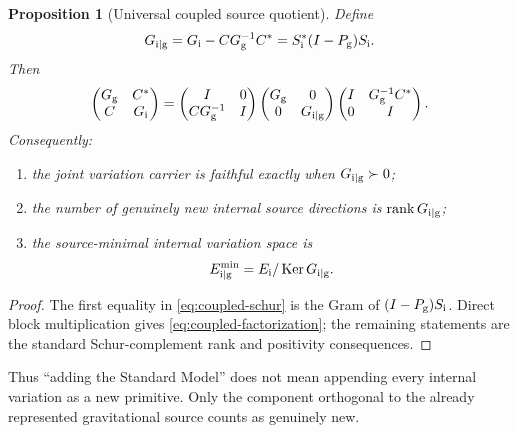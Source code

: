 \documentclass[11pt]{article}
\numberwithin{equation}{section}
\newtheorem{proposition}[theorem]{Proposition}
\theoremstyle{definition}
\theoremstyle{remark}
\newcommand{\rank}{\operatorname{rank}}
\newcommand{\Ker}{\operatorname{Ker}}
\begin{document}
\begin{proposition}[Universal coupled source quotient]
\label{thm:coupled-schur}
Define
\begin{equation}
G_{{\rm i}\mid{\rm g}}
=
G_{\rm i}-CG_{\rm g}^{-1}C^*
=
S_{\rm i}^*(I-P_{\rm g})S_{\rm i}.
\label{eq:coupled-schur}
\end{equation}
Then
\begin{equation}
\begin{pmatrix}
G_{\rm g}&C^*\\
C&G_{\rm i}
\end{pmatrix}
=
\begin{pmatrix}
I&0\\
CG_{\rm g}^{-1}&I
\end{pmatrix}
\begin{pmatrix}
G_{\rm g}&0\\
0&G_{{\rm i}\mid{\rm g}}
\end{pmatrix}
\begin{pmatrix}
I&G_{\rm g}^{-1}C^*\\
0&I
\end{pmatrix}.
\label{eq:coupled-factorization}
\end{equation}
Consequently:
\begin{enumerate}[label=\textup{(\roman*)},leftmargin=2.8em]
\item the joint variation carrier is faithful exactly when
      $G_{{\rm i}\mid{\rm g}}\succ0$;
\item the number of genuinely new internal source directions is
      $\rank G_{{\rm i}\mid{\rm g}}$;
\item the source-minimal internal variation space is
      \[
      E_{{\rm i}\mid{\rm g}}^{\min}
      =
      E_{\rm i}/\Ker G_{{\rm i}\mid{\rm g}}.
      \]
\end{enumerate}
\end{proposition}

\begin{proof}
The first equality in \eqref{eq:coupled-schur} is the Gram of
$(I-P_{\rm g})S_{\rm i}$.  Direct block multiplication gives
\eqref{eq:coupled-factorization}; the remaining statements are the standard
Schur-complement rank and positivity consequences.
\end{proof}

Thus ``adding the Standard Model'' does not mean appending every internal
variation as a new primitive.  Only the component orthogonal to the already
represented gravitational source counts as genuinely new.
\end{document}
